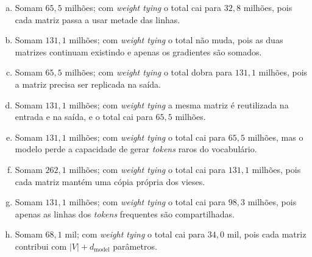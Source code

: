\documentclass[11pt,a4paper]{article}
\begin{document}
\begin{enumerate}[1)]
\begin{enumerate}[a)]
    \item Somam $65{,}5$ milhões; com \textit{weight tying} o total cai para $32{,}8$ milhões, pois cada matriz passa a usar metade das linhas.
    \item Somam $131{,}1$ milhões; com \textit{weight tying} o total não muda, pois as duas matrizes continuam existindo e apenas os gradientes são somados.
    \item Somam $65{,}5$ milhões; com \textit{weight tying} o total dobra para $131{,}1$ milhões, pois a matriz precisa ser replicada na saída.
    \item Somam $131{,}1$ milhões; com \textit{weight tying} a mesma matriz é reutilizada na entrada e na saída, e o total cai para $65{,}5$ milhões.
    \item Somam $131{,}1$ milhões; com \textit{weight tying} o total cai para $65{,}5$ milhões, mas o modelo perde a capacidade de gerar \textit{tokens} raros do vocabulário.
    \item Somam $262{,}1$ milhões; com \textit{weight tying} o total cai para $131{,}1$ milhões, pois cada matriz mantém uma cópia própria dos vieses.
    \item Somam $131{,}1$ milhões; com \textit{weight tying} o total cai para $98{,}3$ milhões, pois apenas as linhas dos \textit{tokens} frequentes são compartilhadas.
    \item Somam $68{,}1$ mil; com \textit{weight tying} o total cai para $34{,}0$ mil, pois cada matriz contribui com $|V| + d_\text{model}$ parâmetros.
\end{enumerate}

\end{enumerate}
\end{document}
